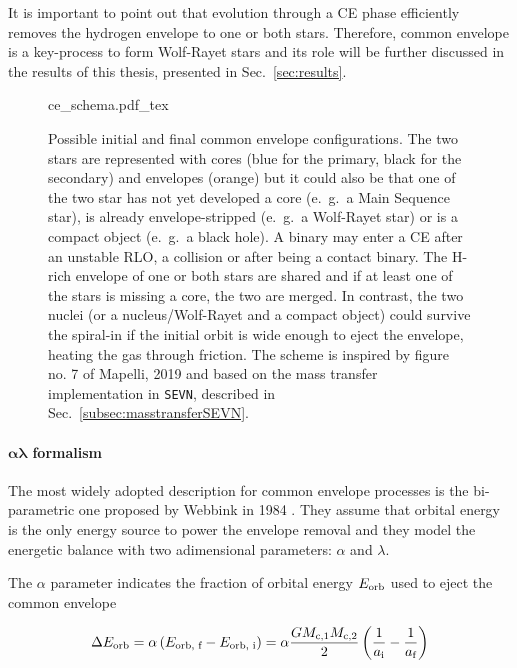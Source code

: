 \documentclass[a4paper,titlepage]{book}     	%
\begin{document}
It is important to point out that evolution through a CE phase efficiently removes the hydrogen envelope to one or both stars. Therefore, common envelope is a key-process to form Wolf-Rayet stars and its role will be further discussed in the results of this thesis, presented in Sec.\ \ref{sec:results}.


\begin{figure}
	\centering
	\def\svgwidth{0.9\textwidth}
	{ce_schema.pdf_tex} 
	\caption{Possible initial and final common envelope configurations. The two stars are represented with cores (blue for the primary, black for the secondary) and envelopes (orange) but it could also be that one of the two star has not yet developed a core (e.\ g.\ a Main Sequence star), is already envelope-stripped (e.\ g.\ a Wolf-Rayet star) or is a compact object (e.\ g.\ a black hole). A binary may enter a CE after an unstable RLO, a collision or after being a contact binary. The H-rich envelope of one or both stars are shared and if at least one of the stars is missing a core, the two are merged. In contrast, the two nuclei (or a nucleus/Wolf-Rayet and a compact object) could survive the spiral-in if the initial orbit is wide enough to eject the envelope, heating the gas through friction. The scheme is inspired by figure no. 7 of Mapelli, 2019 \cite{mapelli} and based on the mass transfer implementation in \texttt{SEVN}, described in Sec.\ \ref{subsec:masstransferSEVN}.}\label{fig:ce_mapelli}
\end{figure}


\paragraph{$\boldsymbol{\alpha \lambda}$ formalism} The most widely adopted description for common envelope processes is the bi-parametric one proposed by Webbink in 1984 \cite{Webbink1984_CE}. They assume that orbital energy is the only energy source to power the envelope removal and they model the energetic balance with two adimensional parameters: $\alpha$ and $\lambda$.

The $\alpha$ parameter indicates the fraction of orbital energy  $E_{\rm orb}$ used to eject the common envelope

\begin{equation}\label{eq:EorbCEalpha}
\Delta E_\textup{orb} = \alpha \left(E_\textup{orb, f} - E_\textup{orb, i}\right) = \alpha \frac{G M_\textup{c,1} M_\textup{c,2}}{2} \left(\frac{1}{a_\textup{i}} - \frac{1}{a_\textup{f}}\right)
\end{equation}
\end{document}
